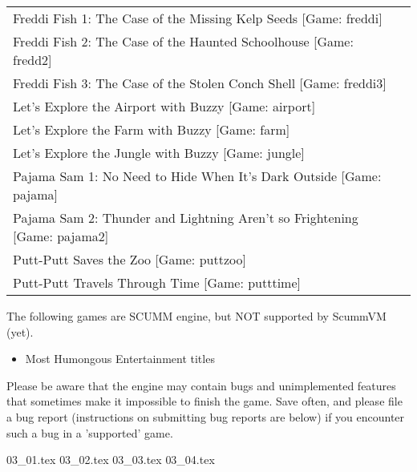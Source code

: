 \begin{itemize}
\begin{tabular}{ll}
  Freddi Fish 1: The Case of the Missing Kelp Seeds         [Game: freddi]\\
  Freddi Fish 2: The Case of the Haunted Schoolhouse        [Game: fredd2]\\
  Freddi Fish 3: The Case of the Stolen Conch Shell         [Game: freddi3]\\
  Let's Explore the Airport with Buzzy                      [Game: airport]\\
  Let's Explore the Farm with Buzzy                         [Game: farm]\\
  Let's Explore the Jungle with Buzzy                       [Game: jungle]\\
  Pajama Sam 1: No Need to Hide When It's Dark Outside      [Game: pajama]\\
  Pajama Sam 2: Thunder and Lightning Aren't so Frightening [Game: pajama2]\\
  Putt-Putt Saves the Zoo                                   [Game: puttzoo]\\
  Putt-Putt Travels Through Time                            [Game: putttime]\\
\end{tabular}

  The following games are SCUMM engine, but NOT supported by ScummVM (yet).
  \begin{itemize}
  \item Most Humongous Entertainment titles
  \end{itemize}
%
Please be aware that the engine may contain bugs and unimplemented features
that sometimes make it impossible to finish the game. Save often, and please
file a bug report (instructions on submitting bug reports are below) if you
encounter such a bug in a 'supported' game.
\end{itemize}
 {03_01.tex}
 {03_02.tex}
 {03_03.tex}
 {03_04.tex}


